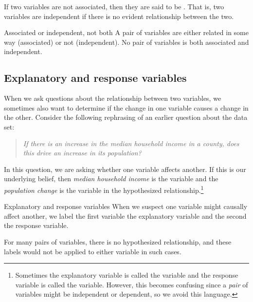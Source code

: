If two variables are not associated,
then they are said to be .
That is, two variables are independent if there
is no evident relationship between the two.

\begin{onebox}{Associated or independent, not both}
A pair of variables are either related in some way (associated) or not (independent). No pair of variables is both associated and independent.
\end{onebox}


\D{\newpage}

\subsection{Explanatory and response variables}
\label{explanatoryAndResponse}

When we ask questions about the relationship
between two variables, we sometimes also want to determine
if the change in one variable causes a change in the other.
Consider the following rephrasing of an earlier question
about the  data set:
\begin{quote}\em
  If there is an increase in the median household income
  in a county, does this drive an increase in its population?
\end{quote}
In this question, we are asking whether one variable
affects another.
If this is our underlying belief,
then \emph{median household income} is the
variable and the \emph{population change} is the
 variable
in the hypothesized relationship.\footnote{Sometimes
  the explanatory variable is called the 
  variable and the response variable is called the
   variable.
  However, this becomes confusing since a \emph{pair}
  of variables might be independent or dependent,
  so we avoid this language.}


\begin{onebox}{Explanatory and response variables}
When we suspect one variable might causally affect another,
we label the first variable the explanatory variable and the
second the response variable.
\vspace{1mm}

\hspace{10mm}

For many pairs of variables, there is no hypothesized
relationship, and these labels would not be applied to
either variable in such cases.
\end{onebox}

